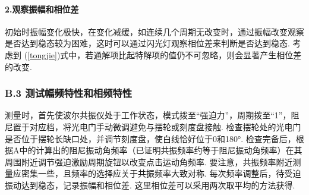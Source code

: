 \documentclass[UTF8]{ctexart}
\begin{document}
\paragraph{2.观察振幅和相位差}初始时振幅变化极快，在变化减缓，如连续几个周期无改变时，通过振幅改变观察是否达到稳态较为困难，这时可以通过闪光灯观察相位差来判断是否达到稳态. 考虑到 (\ref{tongjie})式中，若通解项比起特解项的值仍不可忽略，则会显著产生相位差的改变.
\subsubsection*{B.3 测试幅频特性和相频特性}
测量时，首先使波尔共振仪处于工作状态，模式拨至“强迫力”，周期拨至“1”，阻尼置于对应档，将光电门手动微调避免与摆轮或刻度盘接触. 检查摆轮处的光电门是否位于摆轮长缺口处，并调节刻度盘，使白线恰好位于0和180°. 检查完备后，根据A中的计算出的阻尼振动角频率（已证明共振频率约等于阻尼振动角频率）在其周围附近调节强迫激励周期旋钮以改变点击运动角频率. 要注意，共振频率附近测量应密集一些，且频率的选择应关于共振频率大致对称. 每次频率调整后，待受迫振动达到稳态，记录振幅和相位差. 这里相位差可以采用两次取平均的方法获得.\par
\end{document}
